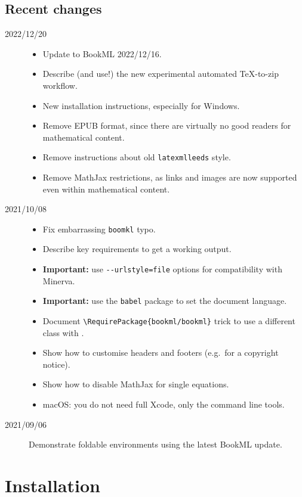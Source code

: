 \documentclass[a4paper]{article}
\def\ltxinline{\lstinline[style=latexml,frame=none]}
\theoremstyle{definition}
\begin{document}
\subsection*{Recent changes}
\begin{description}
  \item[2022/12/20]
    \begin{itemize}
      \item Update to BookML 2022/12/16.
      \item Describe (and use!) the new experimental automated \TeX{}-to-zip workflow.
      \item New installation instructions, especially for Windows.
      \item Remove EPUB format, since there are virtually no good readers for mathematical content.
      \item Remove instructions about old \texttt{latexmlleeds} style.
      \item Remove MathJax restrictions, as links and images are now supported even within mathematical content.
    \end{itemize}
  \item[2021/10/08]
    \begin{itemize}
      \item Fix embarrassing \ltxinline|boomkl| typo.
      \item Describe key requirements to get a working output.
      \item \textbf{Important:} use \ltxinline|--urlstyle=file| options for compatibility with Minerva.
      \item \textbf{Important:} use the \ltxinline|babel| package to set the document language.
      \item Document \ltxinline|\RequirePackage{bookml/bookml}| trick to use a different class with \LaTeXML{}.
      \item Show how to customise headers and footers (e.g.\ for a copyright notice).
      \item Show how to disable MathJax for single equations.
      \item macOS: you do not need full Xcode, only the command line tools.
    \end{itemize}
  \item[2021/09/06] Demonstrate foldable environments using the latest BookML update.
  \end{description}

\tableofcontents

\section{Installation}
\end{document}
